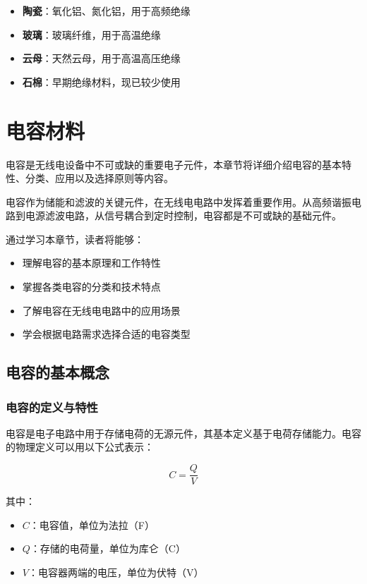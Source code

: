 \documentclass[12pt,UTF8]{ctexbook}
\begin{document}
\begin{itemize}[leftmargin=3.5em]
    \item \textbf{陶瓷}：氧化铝、氮化铝，用于高频绝缘
    \item \textbf{玻璃}：玻璃纤维，用于高温绝缘
    \item \textbf{云母}：天然云母，用于高温高压绝缘
    \item \textbf{石棉}：早期绝缘材料，现已较少使用
\end{itemize}

\chapter{电容材料}

电容是无线电设备中不可或缺的重要电子元件，本章节将详细介绍电容的基本特性、分类、应用以及选择原则等内容。

电容作为储能和滤波的关键元件，在无线电电路中发挥着重要作用。从高频谐振电路到电源滤波电路，从信号耦合到定时控制，电容都是不可或缺的基础元件。

通过学习本章节，读者将能够：

\begin{itemize}[leftmargin=3.5em]
    \item 理解电容的基本原理和工作特性
    \item 掌握各类电容的分类和技术特点
    \item 了解电容在无线电电路中的应用场景
    \item 学会根据电路需求选择合适的电容类型
\end{itemize}

\section{电容的基本概念}

\subsection{电容的定义与特性}

电容是电子电路中用于存储电荷的无源元件，其基本定义基于电荷存储能力。电容的物理定义可以用以下公式表示：

\[ C = \frac{Q}{V} \]

其中：
\begin{itemize}[leftmargin=3.5em]
    \item $C$：电容值，单位为法拉（F）
    \item $Q$：存储的电荷量，单位为库仑（C）
    \item $V$：电容器两端的电压，单位为伏特（V）
\end{itemize}
\end{document}
